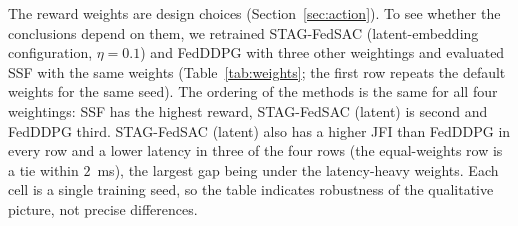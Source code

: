 The reward weights are design choices (Section~\ref{sec:action}). To see whether the conclusions depend on them, we retrained STAG-FedSAC (latent-embedding configuration, $\eta=0.1$) and FedDDPG with three other weightings and evaluated SSF with the same weights (Table~\ref{tab:weights}; the first row repeats the default weights for the same seed). The ordering of the methods is the same for all four weightings: SSF has the highest reward, STAG-FedSAC (latent) is second and FedDDPG third. STAG-FedSAC (latent) also has a higher JFI than FedDDPG in every row and a lower latency in three of the four rows (the equal-weights row is a tie within $2$~ms), the largest gap being under the latency-heavy weights. Each cell is a single training seed, so the table indicates robustness of the qualitative picture, not precise differences.

